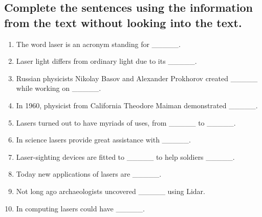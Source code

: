 \subsection*{Complete the sentences using the information from the text without
      looking into the text.}
\begin{enumerate}
      \item The word laser is an acronym standing for \_\_\_\_\_.
      \item Laser light differs from ordinary light due to its \_\_\_\_\_.
      \item Russian physicists Nikolay Basov and Alexander Prokhorov created \_\_\_\_\_
            while working on \_\_\_\_\_.
      \item In 1960, physicist from California Theodore Maiman demonstrated \_\_\_\_\_.
      \item Lasers turned out to have myriads of uses, from \_\_\_\_\_ to \_\_\_\_\_.
      \item In science lasers provide great assistance with \_\_\_\_\_.
      \item Laser-sighting devices are fitted to \_\_\_\_\_ to help soldiers \_\_\_\_\_.
      \item Today new applications of lasers are \_\_\_\_\_.
      \item Not long ago archaeologists uncovered \_\_\_\_\_ using Lidar.
      \item In computing lasers could have \_\_\_\_\_.
\end{enumerate}


